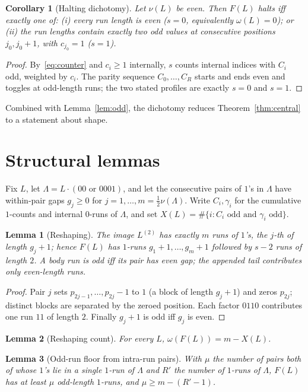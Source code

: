 \documentclass[11pt,reqno]{amsart}
\theoremstyle{plain}
\newtheorem{lemma}{Lemma}
\newtheorem{corollary}{Corollary}
\theoremstyle{definition}
\theoremstyle{remark}
\begin{document}
\begin{corollary}[Halting dichotomy]\label{cor:halting}
Let $\nu(L)$ be even. Then $F(L)$ halts iff exactly one of: (i) every run length is even ($s=0$, equivalently $\omega(L)=0$); or (ii) the run lengths contain exactly two odd values at consecutive positions $j_0,j_0+1$, with $c_{j_0}=1$ ($s=1$).
\end{corollary}
\begin{proof}
By~\eqref{eq:counter} and $c_i\ge 1$ internally, $s$ counts internal indices with $C_i$ odd, weighted by $c_i$. The parity sequence $C_0,\dots,C_R$ starts and ends even and toggles at odd-length runs; the two stated profiles are exactly $s=0$ and $s=1$.
\end{proof}

Combined with Lemma~\ref{lem:odd}, the dichotomy reduces Theorem~\ref{thm:central} to a statement about shape.

\section{Structural lemmas}\label{sec:struct}
Fix $L$, let $\Lambda=L\cdot(00\text{ or }0001)$, and let the consecutive pairs of $1$'s in $\Lambda$ have within-pair gaps $g_j\ge 0$ for $j=1,\dots,m=\tfrac12\nu(\Lambda)$. Write $C_i,\gamma_i$ for the cumulative $1$-counts and internal $0$-runs of $\Lambda$, and set $X(L)=\#\{i:C_i\text{ odd and }\gamma_i\text{ odd}\}$.

\begin{lemma}[Reshaping]\label{lem:reshape}
The image $L^{(2)}$ has exactly $m$ runs of $1$'s, the $j$-th of length $g_j+1$; hence $F(L)$ has $1$-runs $g_1+1,\dots,g_m+1$ followed by $s-2$ runs of length $2$. A body run is odd iff its pair has even gap; the appended tail contributes only even-length runs.
\end{lemma}
\begin{proof}
Pair $j$ sets $p_{2j-1},\dots,p_{2j}-1$ to $1$ (a block of length $g_j+1$) and zeros $p_{2j}$; distinct blocks are separated by the zeroed position. Each factor $0110$ contributes one run $11$ of length $2$. Finally $g_j+1$ is odd iff $g_j$ is even.
\end{proof}

\begin{lemma}[Reshaping count]\label{lem:reshapecount}
For every $L$, $\omega(F(L))=m-X(L)$.
\end{lemma}

\begin{lemma}[Odd-run floor from intra-run pairs]\label{lem:oddrunfloor}
With $\mu$ the number of pairs both of whose $1$'s lie in a single $1$-run of $\Lambda$ and $R'$ the number of $1$-runs of $\Lambda$, $F(L)$ has at least $\mu$ odd-length $1$-runs, and $\mu\ge m-(R'-1)$.
\end{lemma}
\end{document}
